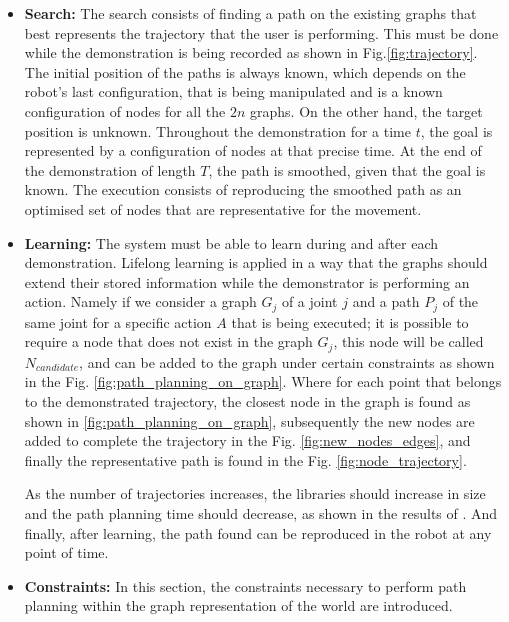 \documentclass[thesis]{mas_proposal}
\begin{document}
\begin{itemize}    
	
	\item \textbf{Search:}
	The search consists of finding a path on the existing graphs that best represents the trajectory that the user is performing. This must be done while the demonstration is being recorded as shown in Fig.\ref{fig:trajectory}. The initial position of the paths is always known, which depends on the robot's last configuration, that is being manipulated and is a known configuration of nodes for all the $2n$ graphs. On the other hand, the target position is unknown. Throughout the demonstration for a time $t$, the goal is represented by a configuration of nodes at that precise time. At the end of the demonstration of length $T$, the path is smoothed, given that the goal is known. The execution consists of reproducing the smoothed path as an optimised set of nodes that are representative for the movement.
	
	\item \textbf{Learning:}
	The system must be able to learn during and after each demonstration. Lifelong learning is applied in a way that the graphs should extend their stored information while the demonstrator is performing an action. Namely if we consider a graph $G_j$ of a joint $j$ and a path $P_j$ of the same joint for a specific action $A$ that is being executed; it is possible to require a node that does not exist in the graph $G_j$, this node will be called $N_{candidate}$, and can be added to the graph under certain constraints as shown in the Fig. \ref{fig:path_planning_on_graph}. Where for each point that belongs to the demonstrated trajectory, the closest node in the graph is found as shown in \ref{fig:path_planning_on_graph}, subsequently the new nodes are added to complete the trajectory in the Fig. \ref{fig:new_nodes_edges}, and finally the representative path is found in the Fig. \ref{fig:node_trajectory}.
	
	As the number of trajectories increases, the libraries should increase in size and the path planning time should decrease, as shown in the results of \cite{Berenson2012, Coleman2015}. And finally, after learning, the path found can be reproduced in the robot at any point of time. 
	
	\item \textbf{Constraints:}
	In this section, the constraints necessary to perform path planning within the graph representation of the world are introduced.
	

\end{itemize}
\end{document}
